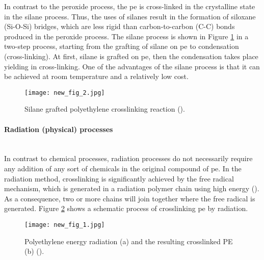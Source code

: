 In contrast to the peroxide process, the \acrshort{pe} is cross-linked in the crystalline state in the silane process. Thus, the uses of silanes result in the formation of siloxane (Si-O-Si) bridges, which are less rigid than carbon-to-carbon (C-C) bonds produced in the peroxide process. The silane process is shown in Figure \ref{ch3:figure:reaction} in a two-step process, starting from the grafting of silane on \acrshort{pe} to condensation (cross-linking). At first, silane is grafted on \acrshort{pe}, then the condensation takes place yielding in cross-linking. One of the advantages of the silane process is that it can be achieved at room temperature and a relatively low cost.

\begin{figure}[H]
\captionsetup[subfigure]{justification=raggedright}
\centering
\texttt{[image: new\_fig\_2.jpg]}
\caption{Silane grafted polyethylene crosslinking reaction (\cite{kurtz2009cross}).}
\label{ch3:figure:reaction}
\end{figure}

\paragraph{Radiation (physical) processes} \hfill \\
In contrast to chemical processes, radiation processes do not necessarily require any addition of any sort of chemicals in the original compound of \acrshort{pe}. In the radiation method, crosslinking is significantly achieved by the free radical mechanism, which is generated in a radiation polymer chain using high energy (\cite{peacock2000handbook}). As a consequence, two or more chains will join together where the free radical is generated. Figure \ref{ch3:figure:radiation} shows a schematic process of crosslinking \acrshort{pe} by radiation.

\begin{figure}[H]
\captionsetup[subfigure]{justification=raggedright}
\centering
\texttt{[image: new\_fig\_1.jpg]}
\caption{Polyethylene energy radiation (a) and the resulting crosslinked PE (b) (\cite{peacock2000handbook}).}
\label{ch3:figure:radiation}
\end{figure}

